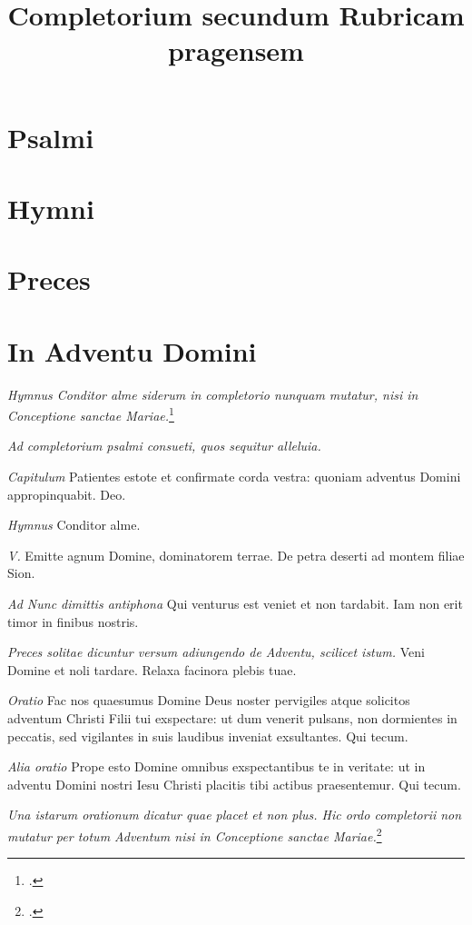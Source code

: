 \documentclass[a4paper, 12pt]{article}
\title{Completorium secundum Rubricam pragensem}
\newcommand{\rubrica}[1]{\textit{#1}}
\newcommand{\incipit}[1]{\textup{#1}}
\begin{document}
\maketitle

\section{Psalmi}

\section{Hymni}

\section{Preces}

\section{In Adventu Domini}

\rubrica{Hymnus \incipit{Conditor alme siderum} in completorio
  nunquam mutatur, nisi in Conceptione sanctae Mariae.}\footcite[83r]{bp1502}

\rubrica{Ad completorium psalmi consueti, quos sequitur \incipit{alleluia.}}

\rubrica{Capitulum}
Patientes estote et confirmate corda vestra:
quoniam adventus Domini appropinquabit.
Deo.

\rubrica{Hymnus}
Conditor alme.

\rubrica{V.}
Emitte agnum Domine, dominatorem terrae.
De petra deserti ad montem filiae Sion.

\rubrica{Ad Nunc dimittis antiphona}
Qui venturus est veniet et non tardabit. Iam non erit timor in finibus nostris.

\rubrica{Preces solitae dicuntur versum adiungendo de Adventu, scilicet istum.}
Veni Domine et noli tardare. Relaxa facinora plebis tuae.

\rubrica{Oratio}
Fac nos quaesumus Domine Deus noster pervigiles atque solicitos adventum
Christi Filii tui exspectare: ut dum venerit pulsans,
non dormientes in peccatis, sed vigilantes in suis laudibus inveniat
exsultantes. Qui tecum.

\rubrica{Alia oratio}
Prope esto Domine omnibus exspectantibus te in veritate:
ut in adventu Domini nostri Iesu Christi placitis tibi actibus praesentemur.
Qui tecum.

\rubrica{Una istarum orationum dicatur quae placet et non plus.
  Hic ordo completorii non mutatur per totum Adventum
  nisi in Conceptione sanctae Mariae.}\footcite[83r-83v]{bp1502}

\printbibliography
\end{document}
